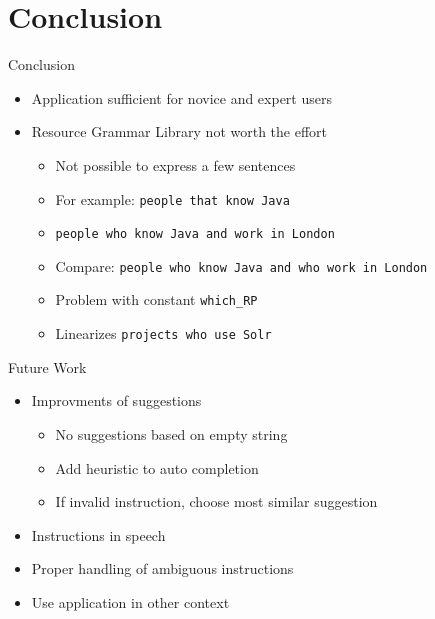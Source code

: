 \section{Conclusion} 
\begin{frame}{Conclusion}\pause
\begin{itemize}
\item Application sufficient for novice and expert users \pause
\item Resource Grammar Library not worth the effort\pause
  \begin{itemize}
    \item Not possible to express a few sentences\pause
    \item For example: \texttt{people \textcolor{String}{that} know Java}\pause
    \item \texttt{people \textcolor{String}{who} know Java and work in London} \pause
    \item Compare: \texttt{\footnotesize people \textcolor{String}{who} know Java and \textcolor{String}{who} work in London} \pause
    \item Problem with constant \texttt{which\_RP}\pause
    \item Linearizes \texttt{projects \textcolor{String}{who} use Solr}\pause  
  \end{itemize}
\end{itemize}
\end{frame}

\begin{frame}{Future Work}\pause
\begin{itemize}
\item Improvments of suggestions \pause
\begin{itemize}
  \item No suggestions based on empty string \pause
  \item Add heuristic to auto completion \pause
  \item If invalid instruction, choose most similar suggestion \pause
\end{itemize}
\item Instructions in speech \pause
\item Proper handling of ambiguous instructions \pause
\item Use application in other context
\end{itemize}
\end{frame}